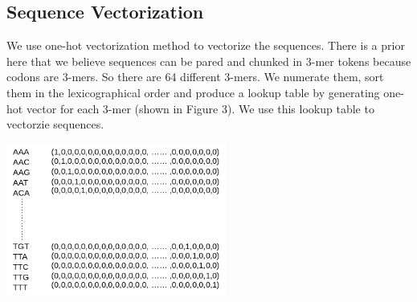 \documentclass[letterpaper, 11pt]{article}
\newenvironment{Figure}
  {\par\medskip\noindent\minipage{\linewidth}}
  {\endminipage\par\medskip}
\begin{document}
\begin{multicols*}{2}
{\subsection{Sequence Vectorization}
We use one-hot vectorization method to vectorize the sequences. There is a prior here that we believe sequences can be pared and chunked in 3-mer tokens because codons are 3-mers. So there are 64 different 3-mers. We numerate them, sort them in the lexicographical order and produce a lookup table by generating one-hot vector for each 3-mer (shown in Figure 3). We use this lookup table to vectorzie sequences.
\begin{Figure}
\includegraphics[height=5cm, width=\textwidth]{lookup_table.png}
\end{Figure} 
}
\end{multicols*}
\end{document}
